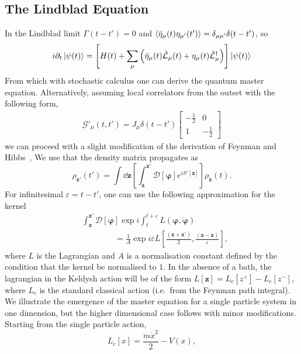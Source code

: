\documentclass{article}
\let\vec\bm
\begin{document}
\subsection{The Lindblad Equation}
In the Lindblad limit $\Gamma(t-t') = 0$ and $\ev{\bar{\eta}_\mu(t)\eta_{\mu'}(t')} = \delta_{\mu\mu'}\delta(t-t')$, so
\begin{equation}
    i\partial_t \ket{\psi(t)} =\left[H(t) + \sum_\mu \left(\bar{\eta}_\mu(t) \hat{\mathcal{L}}_\mu(t) + \eta_\mu(t)\hat{\mathcal{L}}^\dagger_\mu \right)\right]\ket{\psi(t)}\nonumber
\end{equation}
From which with stochastic calculus one can derive the quantum master equation. 
Alternatively, assuming local correlators from the outset with the following form,
\begin{align}
    \mathcal{G}'_\mu(t, t') = J_\mu\delta(t-t') \begin{bmatrix} -\frac{1}{2} & 0 \\ 1 & -\frac{1}{2}\end{bmatrix}
\end{align}
we can proceed with a slight modification of the derivation of Feynman and Hibbs~\cite{Feynman},
We use that the density matrix propagates as
\begin{equation}
    \rho_{\vec{z}'}(t') = \int \dd{\vec{z}} \left[\int_{\vec{z}}^{\vec{z'}} \mathcal{D}[\vec{\varphi}]e^{iS'[\vec{z}]} \right]\rho_{\vec{z}}(t)\label{eq:prop}.
\end{equation}
For infinitesimal $\varepsilon = t-t'$, one can use the following approximation for the kernel
\begin{align}
    &\int_{\vec{z}}^{\vec{z}'} \mathcal{D}[\vec{\varphi}]\exp{i\int_t^{t+\varepsilon} L(\vec{\varphi}, \dot{\vec{\varphi}})}\nonumber \\
    &\qquad\qquad= \frac{1}{A} \exp{i\varepsilon L\left[\frac{(\vec{z}+\vec{z}')}{2}, \frac{(\vec{z}-\vec{z})}{\varepsilon}\right]},\label{eq:approx}
\end{align}
where $L$ is the Lagrangian and $A$ is a normalisation constant defined by the condition that the kernel be normalised to $1$.
In the absence of a bath, the lagrangian in the Keldysh action will be of the form $L[\vec{z}] = L_c[z^+]-L_c[z^-]$, where $L_c$ is the standard classical action (i.e.\ from the Feynman path integral).
We illustrate the emergence of the master equation for a single particle system in one dimension, but the higher dimensional case follows with minor modifications.
Starting from the single particle action,
\begin{equation}
    L_c[x] = \frac{m\dot{x}^2}{2} - V\left(x\right),
\end{equation}
\end{document}
